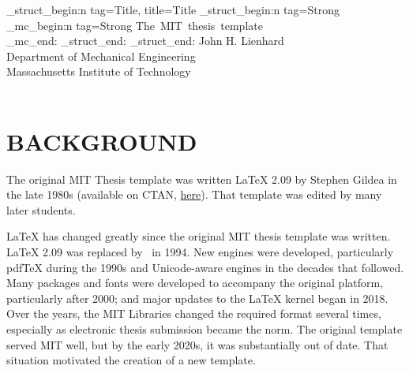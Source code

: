 \documentclass[11pt]{article}
\makeatletter
\newcommand{\daymonthyeardate}{%
  \DTMenglishordinal{\@dtm@day}\space\DTMenglishmonthname{\@dtm@month} \@dtm@year
}
\newcommand*\pdfTeX{pdf\TeX}
\newcommand*\LuaLaTeX{Lua\LaTeX}
\renewcommand\abstractname{SUMMARY}
\makeatother
\begin{document}
\begingroup  
    \centering
	\ExplSyntaxOn
        \tag_struct_begin:n { tag=Title, title=Title }
        \leavevmode
        \tag_struct_begin:n { tag=Strong }
        \tag_mc_begin:n { tag=Strong }
        \LARGE The~MIT~thesis~template
        \\[1em]
        \tag_mc_end:
        \tag_struct_end:
        \tag_struct_end:
	\ExplSyntaxOff
	\leavevmode\large 
	John H. Lienhard\tagmcend\tagstructend \\ 
	Department of Mechanical Engineering \\ Massachusetts Institute of Technology
	\\[1em]
	\daymonthyeardate\\[1em]
\endgroup

\pdfbookmark[1]{\abstractname}{summary}
\begin{abstract}
This \LaTeX{} class formats theses according to the requirements of the MIT Libraries. The template is suitable for MIT theses of all types and at all levels. The title and abstract pages are automatically laid out from information provided by the user. The template includes options for a variety of typefaces, and it is compatible with either \pdfTeX{} or the Unicode-aware engine \LuaLaTeX. When using \LaTeX{} formats dated November 2022 or later, the resulting PDF file meets the PDF/A archivability standard. For formats later than November 2025, the PDF can meet the technical requirements of the PDF/UA-2 accessibility standard.  An up-to-date \href{https://www.tug.org/texlive/}{\TeX{} Live} installation includes all other packages required by the template.  This document provides instructions for installation and use of the template.
\end{abstract}

\tableofcontents

\section{BACKGROUND}\label{sec:1}

The original MIT Thesis template was written \LaTeX{} 2.09 by Stephen Gildea in the late 1980s (available on CTAN, \href{https://mirrors.ctan.org/obsolete/macros/latex209/contrib/mitthesis/mitthesis.sty}{here}). That template was edited by many later students.

LaTeX has changed greatly since the original MIT thesis template was written. \LaTeX{} 2.09 was replaced by \LaTeXe\ in 1994. New engines were developed, particularly \pdfTeX{} during the 1990s and Unicode-aware engines in the decades that followed. Many packages and fonts were developed to accompany the original platform, particularly after 2000; and major updates to the \LaTeX{} kernel began in 2018. Over the years, the MIT Libraries changed the required format several times, especially as electronic thesis submission became the norm. The original template served MIT well, but by the early 2020s, it was substantially out of date. That situation motivated the creation of a new template. 
\end{document}
